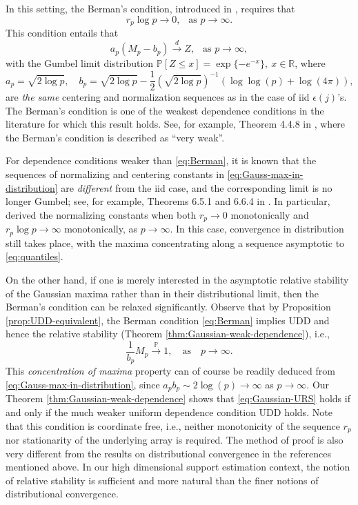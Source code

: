 In this setting, the Berman's condition, introduced in \cite{berman1964limit}, requires that
\begin{equation} \label{eq:Berman}
    r_p \log p \to 0,\ \ \mbox{ as }p\to\infty.
\end{equation}
This condition entails that 
\begin{equation}
    \label{eq:Gauss-max-in-distribution}
  a_p (M_p - b_p) \stackrel{d}{\longrightarrow } Z,\  \ \mbox{ as }p\to\infty,
\end{equation}
with the Gumbel limit distribution $\mathbb P [Z\le x] = \exp\{-e^{-x}\},\ x\in \mathbb R$, 
where 
$$
a_p = \sqrt{2\log p},\quad b_p  = \sqrt{2\log p} - \frac{1}{2}\left(\sqrt{2\log p}\right)^{-1}\left(\log \log (p) + \log(4\pi)\right),
$$ 
are {\em the same} centering and normalization sequences
as in the case of iid $\epsilon(j)$'s.  
The Berman's condition is one of the weakest dependence conditions  in the literature for which this result holds. See, for example, Theorem 4.4.8 in \citet{embrechts2013modelling}, where the Berman's condition is described as ``very weak''.

For dependence conditions weaker than \eqref{eq:Berman}, it is known that the sequences of normalizing and centering constants in \eqref{eq:Gauss-max-in-distribution} are {\em different} from the iid case, and the corresponding limit is no longer Gumbel; see, for example, Theorems 6.5.1 and  6.6.4 in \citet{leadbetter2012extremes}. 
In particular, \citet{mccormick1976weak} derived the normalizing constants when both $r_p\to 0$ monotonically and  $r_p \log p \to \infty$ monotonically, as $p\to\infty$. 
In this case, convergence in distribution still takes place, with the maxima concentrating along a sequence asymptotic to \eqref{eq:quantiles}.

On the other hand, if one is merely interested in the asymptotic relative stability of the Gaussian maxima rather than in their distributional limit, then the Berman's condition
can be relaxed significantly. 
Observe that by Proposition \ref{prop:UDD-equivalent},  the Berman condition \eqref{eq:Berman} implies UDD and hence the relative stability (Theorem \ref{thm:Gaussian-weak-dependence}), i.e., 
\begin{equation} \label{eq:Gaussian-URS}
  \frac{1}{b_p} M_p \stackrel{\mathbb P}{\to} 1,\quad\mbox{as}\quad p\to\infty.
\end{equation}
This {\em concentration of maxima} property can of course be readily deduced from \eqref{eq:Gauss-max-in-distribution}, since $a_p b_p \sim 2\log(p) \to \infty$ as $p\to\infty$.
Our Theorem \ref{thm:Gaussian-weak-dependence} shows that \eqref{eq:Gaussian-URS} holds if and only if the much weaker uniform dependence condition UDD holds. 
Note that this condition is coordinate free, i.e., neither monotonicity of the sequence $r_p$ nor stationarity of the underlying array is required. 
The method of proof is also very different from the results on distributional convergence in the references mentioned above. 
In our high dimensional support estimation context, the notion of relative stability is sufficient and more natural than the finer notions of distributional convergence.



